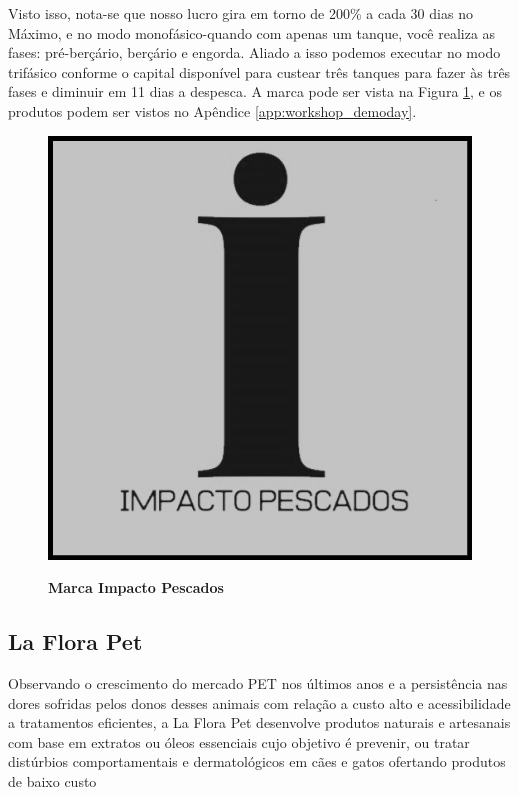 Visto isso, nota-se que nosso lucro gira em torno de 200\% a cada 30 dias no Máximo, e  no modo monofásico-quando com apenas um tanque, você realiza  as fases: pré-berçário, berçário e engorda. Aliado a isso podemos executar no modo trifásico conforme o capital disponível para custear três tanques para fazer às três fases e diminuir em 11 dias a despesca.  A marca pode ser vista na Figura \ref{figura_23}, e os produtos podem ser vistos no Apêndice \ref{app:workshop_demoday}.

\begin{figure}[H]
\centering
\caption{\textbf{Marca Impacto Pescados}}
\includegraphics[scale=0.3]{Imagens/imacto_pescados.jpg}
\label{figura_23}
\end{figure}


\subsection{La Flora Pet}

Observando o crescimento do mercado PET nos últimos anos e a persistência nas dores sofridas pelos donos desses animais com relação a custo alto e acessibilidade a tratamentos eficientes, a La Flora Pet desenvolve produtos naturais e artesanais com base em extratos ou óleos essenciais cujo objetivo é prevenir, ou tratar distúrbios comportamentais e dermatológicos em cães e gatos ofertando produtos de baixo custo

